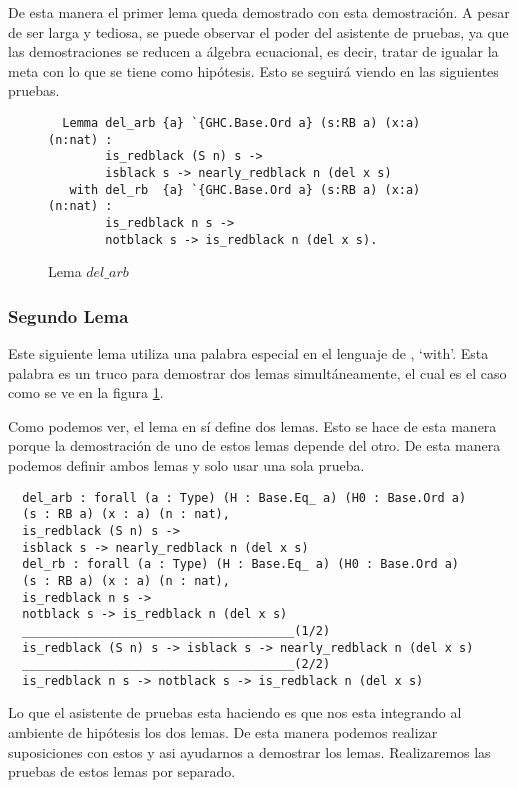 De esta manera el primer lema queda demostrado con esta demostraci\'on. A pesar de ser larga y
tediosa, se puede observar el poder del asistente de pruebas, ya que las demostraciones se reducen
a álgebra ecuacional, es decir, tratar de igualar la meta con lo que se tiene como hip\'otesis.
Esto se seguirá viendo en las siguientes pruebas.

\begin{figure}[!ht]
  \centering
  \captionsetup{justification=centering}
  \begin{verbatim}
  Lemma del_arb {a} `{GHC.Base.Ord a} (s:RB a) (x:a) (n:nat) :
        is_redblack (S n) s ->
        isblack s -> nearly_redblack n (del x s)
   with del_rb  {a} `{GHC.Base.Ord a} (s:RB a) (x:a) (n:nat) :
        is_redblack n s ->
        notblack s -> is_redblack n (del x s).
  \end{verbatim}
  \caption{Lema $del\_arb$}
  \label{lema_6}
  \end{figure}

\subsubsection{Segundo Lema}
Este siguiente lema utiliza una palabra especial en el lenguaje de {\coq}, `with'. Esta palabra
es un truco para demostrar dos lemas simultáneamente, el cual es el caso como se ve en la figura
\ref{lema_6}.

Como podemos ver, el lema en s\'i define dos lemas. Esto se hace de esta manera porque la
demostraci\'on de uno de estos lemas depende del otro. De esta manera podemos definir ambos lemas y
solo usar una sola prueba.

\begin{verbatim}
  del_arb : forall (a : Type) (H : Base.Eq_ a) (H0 : Base.Ord a)
  (s : RB a) (x : a) (n : nat),
  is_redblack (S n) s ->
  isblack s -> nearly_redblack n (del x s)
  del_rb : forall (a : Type) (H : Base.Eq_ a) (H0 : Base.Ord a)
  (s : RB a) (x : a) (n : nat),
  is_redblack n s ->
  notblack s -> is_redblack n (del x s)
  ______________________________________(1/2)
  is_redblack (S n) s -> isblack s -> nearly_redblack n (del x s)
  ______________________________________(2/2)
  is_redblack n s -> notblack s -> is_redblack n (del x s)
\end{verbatim}

Lo que el asistente de pruebas esta haciendo es que nos esta integrando al ambiente de hip\'otesis
los dos lemas. De esta manera podemos realizar suposiciones con estos y asi ayudarnos a demostrar
los lemas. Realizaremos las pruebas de estos lemas por separado.

